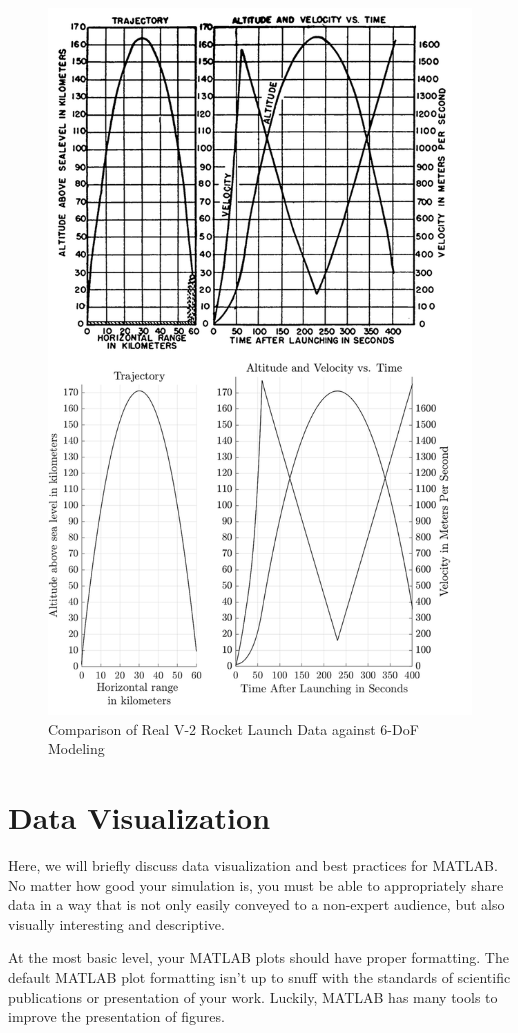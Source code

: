 \documentclass[12pt]{report}
\begin{document}
\begin{figure}
    \centering
    \includegraphics[width=.75\linewidth]{Images/V2 Combined.png}
    \caption{Comparison of Real V-2 Rocket Launch Data against 6-DoF Modeling}
    \label{fig:V2 sim}
\end{figure}


\section{Data Visualization}
Here, we will briefly discuss data visualization and best practices for MATLAB. No matter how good your simulation is, you must be able to appropriately share data in a way that is not only easily conveyed to a non-expert audience, but also visually interesting and descriptive.

At the most basic level, your MATLAB plots should have proper formatting. The default MATLAB plot formatting isn't up to snuff with the standards of scientific publications or presentation of your work. Luckily, MATLAB has many tools to improve the presentation of figures.
\end{document}
